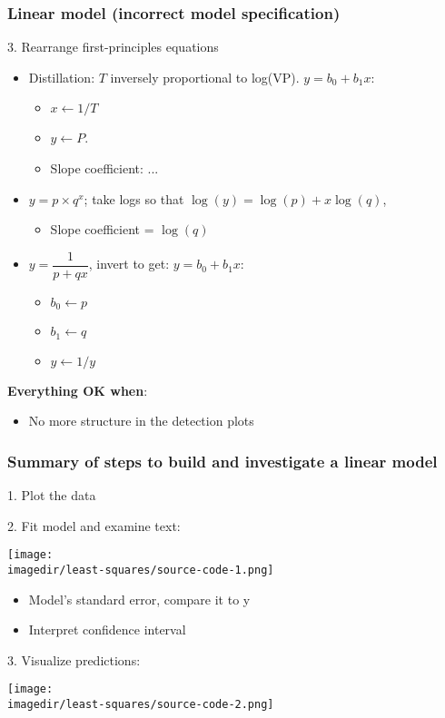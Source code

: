 \begin{frame}\frametitle{Linear model (incorrect model specification)}

	3. Rearrange first-principles equations
	\begin{itemize}
		\item	Distillation: $T$ inversely proportional to log(VP). $y = b_0 + b_1x$:
		\begin{itemize}
			\item	$x \leftarrow 1/T$
			\item	$y \leftarrow P$.
			\item	Slope coefficient: ...
		\end{itemize}
		\item	$y = p \times q^x$; take logs so that $\log(y) = \log(p) + x \log(q)$,
		\begin{itemize}
			\item	Slope coefficient = $\log(q)$
		\end{itemize}
		\item	$y = \dfrac{1}{p+qx}$, invert to get: $y = b_0 + b_1 x$:
		\begin{itemize}
			\item	$b_0 \leftarrow p$
			\item	$b_1 \leftarrow q$
			\item	$y\leftarrow 1/y$
		\end{itemize}
	\end{itemize}

	\textbf{Everything OK when}:
	\begin{itemize}
		\item	No more structure in the detection plots
	\end{itemize}
\end{frame}

\begin{frame}\frametitle{Summary of steps to build and investigate a linear model}

	1. Plot the data

	2. Fit model and examine text:
	\begin{center}
		\texttt{[image: \\imagedir/least-squares/source-code-1.png]}
	\end{center}
	\begin{itemize}
		\item	Model's standard error, compare it to y
		\item	Interpret confidence interval
	\end{itemize}

	3. Visualize predictions:
	\begin{center}
		\texttt{[image: \\imagedir/least-squares/source-code-2.png]}
	\end{center}
\end{frame}

